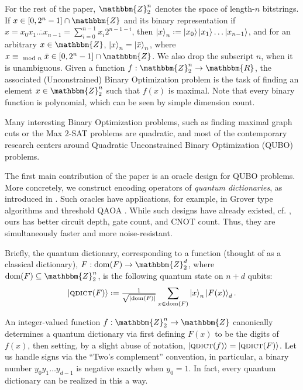 \documentclass[reqno, 10pt]{amsart}
\numberwithin{equation}{section}                %
\let\originalleft\left
\let\originalright\right
\renewcommand{\left}{\mathopen{}\mathclose\bgroup\originalleft}
\renewcommand{\right}{\aftergroup\egroup\originalright}
\def\({\mathopen{}\left(}
\def\){\right)\mathclose{}}
\newcommand*{\eqdef}{\mathrel{\vcenter{\baselineskip0.5ex \lineskiplimit0pt\hbox{.}\hbox{.}}}=}
\def\rl{\mathbbm{R}}
\def\Z{\mathbbm{Z}}
\def\dom{\mathrm{dom}}
\def\qdict{\textsc{qdict}}
\begin{document}
For the rest of the paper, $\Z_2^n$ denotes the space of length-$n$ bitstrings. If $x \in [0, 2^n - 1] \cap \Z$ and its binary representation if $x = \overline{x_0 x_1 \ldots x_{n - 1}} = \sum_{i = 0}^{n - 1} x_i 2^{n - 1 - i}$, then $\ket{x}_n \eqdef \ket{x_0} \ket{x_1} \ldots \ket{x_{n - 1}}$, and for an arbitrary $x \in \Z$, $\ket{x}_n = \ket{\bar{x}}_n$, where $x \equiv_{\mod n} \bar{x} \in [0, 2^n - 1] \cap \Z$. We also drop the subscript $n$, when it is unambiguous. Given a function $f : \Z_2^n \rightarrow \rl$, the associated (Unconstrained) Binary Optimization problem is the task of finding an element $x \in \Z_2^n$ such that $f (x)$ is maximal. Note that every binary function is polynomial, which can be seen by simple dimension count.

Many interesting Binary Optimization problems, such as finding maximal graph cuts or the Max $2$-SAT problems are quadratic, and most of the contemporary research centers around Quadratic Unconstrained  Binary Optimization (QUBO) problems.

\medskip

The first main contribution of the paper is an oracle design for QUBO problems. More concretely, we construct encoding operators of \emph{quantum dictionaries}, as introduced in \cite{gilliam_foundational_2021}. Such oracles have applications, for example, in Grover type algorithms and threshold QAOA \cite{golden_threshold_2021}. While such designs have already existed, cf. \cite{gilliam_grover_2021}, ours has better circuit depth, gate count, and CNOT count. Thus, they are simultaneously faster and more noise-resistant.

Briefly, the quantum dictionary, corresponding to a function (thought of as a classical dictionary), $F: \dom \( F \) \rightarrow \Z_2^d$, where $\dom \( F \) \subseteq \Z_2^n$, is the following quantum state on $n + d$ qubits:
\begin{equation}
   \ket{\qdict \( F \)} \eqdef \tfrac{1}{\sqrt{\left| \dom \( F \) \right|}} \sum\limits_{x \in \dom \( F \)} \ket{x}_n \ket{F (x)}_d.
\end{equation}

An integer-valued function $f : \Z_2^n \rightarrow \Z$ canonically determines a quantum dictionary via first defining $F (x)$ to be the digits of $f (x)$, then setting, by a slight abuse of notation, $\ket{\qdict \( f \)} = \ket{\qdict \( F \)}$. Let us handle signs via the ``Two's complement'' convention, in particular, a binary number $y_0 y_1 \ldots y_{d - 1}$ is negative exactly when $y_0 = 1$. In fact, every quantum dictionary can be realized in this a way.
\end{document}
